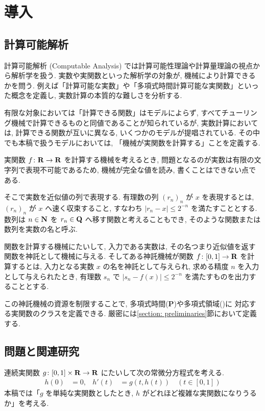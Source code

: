 \section{導入}

\subsection{計算可能解析}

計算可能解析 (Computable Analysis) では計算可能性理論や計算量理論の視点から解析学を扱う. 
実数や実関数といった解析学の対象が, 機械により計算できるかを問う. 
例えば「計算可能な実数」や「多項式時間計算可能な実関数」といった概念を定義し, 
実数計算の本質的な難しさを分析する.

有限な対象においては「計算できる関数」はモデルによらず,
すべてチューリング機械で計算できるものと同値であることが知られているが,
実数計算においては, 計算できる関数が互いに異なる, いくつかのモデルが提唱されている.
その中でも本稿で扱うモデルにおいては,
「機械が実関数を計算する」ことを定義する.

実関数 $f \colon \mathbf R \to \mathbf R$ を計算する機械を考えるとき,
問題となるのが実数は有限の文字列で表現不可能であるため,
機械が完全な値を読み, 書くことはできない点である.

そこで実数を近似値の列で表現する.
有理数の列 $(r_n)_n$ が $x$ を表現するとは,
$(r_n)_n$ が $x$ へ速く収束すること, 
すなわち $|r_n - x| \le 2^{-n}$ を満たすこととする.
数列は $n \in \mathbf N$ を $r_n \in \mathbf Q$ へ移す関数と考えることもでき,
そのような関数または数列を実数の名と呼ぶ.

関数を計算する機械にたいして,
入力である実数は, その名つまり近似値を返す関数を神託として機械に与える.
そしてある神託機械が関数 $f \colon [0, 1] \to \mathbf R$ を計算するとは,
入力となる実数 $x$ の名を神託として与えられ,
求める精度 $n$ を入力として与えられたとき,
有理数 $s_n$ で $|s_n - f(x)| \le 2^{-n}$ を満たすものを出力することとする.

この神託機械の資源を制限することで, 多項式時間({\bf P})や多項式領域(\PSPACE)に
対応する実関数のクラスを定義できる.
厳密には\ref{section: preliminaries}節において定義する.

\subsection{問題と関連研究}

連続実関数 $g \colon [0,1] \times \mathbf R \to \mathbf R$ にたいして次の常微分方程式を考える. 
\begin{align}
 \label{eq:ode}
 h(0) & = 0, &
 h'(t) & = g(t,h(t)) \quad (t \in [0,1])
\end{align}
本稿では「$g$ を単純な実関数としたとき, 
$h$ がどれほど複雑な実関数になりうるか」を考える.


